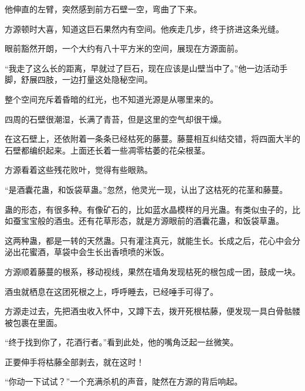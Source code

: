 \begin{this_body}
他伸直的左臂，突然感到前方石壁一空，弯曲了下来。

方源顿时大喜，知道这巨石果然内有空间。他疾走几步，终于挤进这条光缝。

眼前豁然开朗，一个大约有八十平方米的空间，展现在方源面前。

“我走了这么长的距离，早就过了巨石，现在应该是山壁当中了。”他一边活动手脚，舒展四肢，一边打量这处隐秘空间。

整个空间充斥着昏暗的红光，也不知道光源是从哪里来的。

四周的石壁很潮湿，长满了青苔，但是这里的空气却很干燥。

在这石壁上，还依附着一条条已经枯死的藤蔓。藤蔓相互纠结交错，将四面大半的石壁都编织起来。上面还长着一些凋零枯萎的花朵根茎。

方源看着这些残花败叶，觉得有些眼熟。

“是酒囊花蛊，和饭袋草蛊。”忽然，他灵光一现，认出了这枯死的花茎和藤蔓。

蛊的形态，有很多种。有像矿石的，比如蓝水晶模样的月光蛊。有类似虫子的，比如蚕宝宝般的酒虫。还有花草形态，就是方源眼前的酒囊花蛊，和饭袋草蛊。

这两种蛊，都是一转的天然蛊。只有灌注真元，就能生长。长成之后，花心中会分泌出花蜜酒，草袋中会生长出香喷喷的米饭。

方源顺着藤蔓的根系，移动视线，果然在墙角发现枯死的根包成一团，鼓成一块。

酒虫就栖息在这团死根之上，呼呼睡去，已经唾手可得了。

方源走过去，先把酒虫收入怀中，又蹲下去，拨开死根枯藤，便发现一具白骨骷髅被包裹在里面。

“终于找到你了，花酒行者。”看到此处，他的嘴角泛起一丝微笑。

正要伸手将枯藤全部剥去，就在这时！

“你动一下试试？”一个充满杀机的声音，陡然在方源的背后响起。

\end{this_body}


